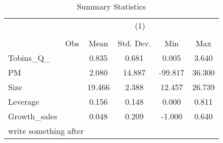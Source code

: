 \begin{table}[htbp]\centering
\def\sym#1{\ifmmode^{#1}\else\(^{#1}\)\fi}
\caption{Summary Statistics}
\begin{tabular}{l*{1}{ccccc}}
\hline\hline
            &\multicolumn{5}{c}{(1)}                                         \\
            &\multicolumn{5}{c}{}                                            \\
            &         Obs&        Mean&   Std. Dev.&         Min&         Max\\
\hline
Tobins\_Q\_   &            &       0.835&       0.681&       0.005&       3.640\\
PM          &            &       2.080&      14.887&     -99.817&      36.300\\
Size        &            &      19.466&       2.388&      12.457&      26.739\\
Leverage    &            &       0.156&       0.148&       0.000&       0.811\\
Growth\_sales&            &       0.048&       0.209&      -1.000&       0.640\\
\hline\hline
\multicolumn{6}{l}{\footnotesize write something after}\\
\end{tabular}
\end{table}

